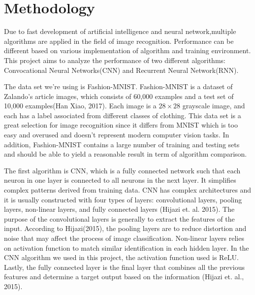 \documentclass[letterpaper]{article} %
\begin{document}
\section{Methodology}

Due to fast development of artificial intelligence and neural network,multiple algorithms are applied in the field of image recognition. Performance can be different based on various implementation of algorithm and training environment. This project aims to analyze the performance of two different algorithms: Convocational Neural Networks(CNN) and Recurrent Neural Network(RNN).

The data set we're using is Fashion-MNIST. Fashion-MNIST is a dataset of Zalando's article images, which consists of 60,000 examples and a test set of 10,000 examples(Han Xiao, 2017). Each image is a $28 \times 28$ grayscale image, and each has a label associated from different classes of clothing. This data set is a great selection for image recognition since it differs from MNIST which is too easy and overused and doesn't represent modern computer vision tasks. In addition, Fashion-MNIST contains a large number of training and testing sets and should be able to yield a reasonable result in term of algorithm comparison.

The first algorithm is CNN, which is a fully connected network such that each neuron in one layer is connected to all neurons in the next layer. It simplifies complex patterns derived from training data. CNN has complex architectures and it is usually constructed with four types of layers: convolutional layers, pooling layers, non-linear layers, and fully connected layers (Hijazi et. al. 2015). The purpose of the convolutional layers is generally to extract the features of the input. According to Hijazi(2015), the pooling layers are to reduce distortion and noise that may affect the process of image classification. Non-linear layers relies on activation function to match similar identification in each hidden layer. In the CNN algorithm we used in this project, the activation function used is ReLU. Lastly, the fully connected layer is the final layer that combines all the previous features and determine a target output based on the information (Hijazi et. al., 2015).
\end{document}
